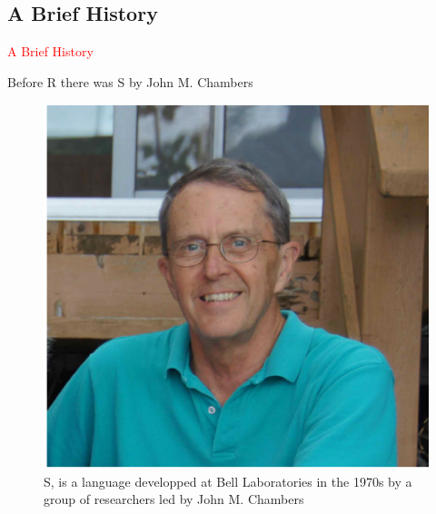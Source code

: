 \documentclass[11pt]{beamer}\usepackage[]{graphicx}\usepackage[]{color}
\begin{document}
\subsection{A Brief History}

\begin{frame}
 \begin{center}
  \Huge{\textcolor{red}{A Brief History}}
 \end{center}
\end{frame}


\begin{frame}{Before R there was S by John M. Chambers}
\begin{center}
\begin{figure}
\includegraphics[scale=0.7]{john.png}
\caption{S, is a language developped at Bell Laboratories in the 1970s by a group of researchers led by John M. Chambers}
\end{figure}
\end{center}
\end{frame}
\end{document}
